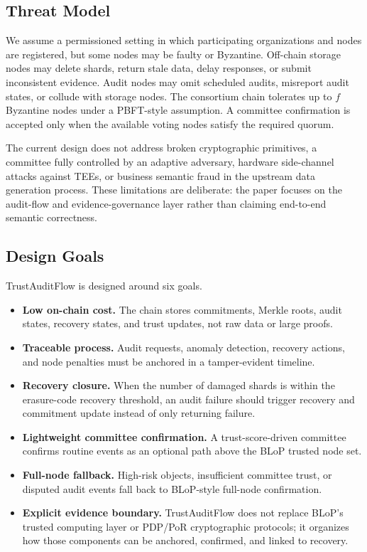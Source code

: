\subsection{Threat Model}

We assume a permissioned setting in which participating organizations and nodes are registered, but some nodes may be faulty or Byzantine. Off-chain storage nodes may delete shards, return stale data, delay responses, or submit inconsistent evidence. Audit nodes may omit scheduled audits, misreport audit states, or collude with storage nodes. The consortium chain tolerates up to $f$ Byzantine nodes under a PBFT-style assumption. A committee confirmation is accepted only when the available voting nodes satisfy the required quorum.

The current design does not address broken cryptographic primitives, a committee fully controlled by an adaptive adversary, hardware side-channel attacks against TEEs, or business semantic fraud in the upstream data generation process. These limitations are deliberate: the paper focuses on the audit-flow and evidence-governance layer rather than claiming end-to-end semantic correctness.

\subsection{Design Goals}

TrustAuditFlow is designed around six goals.

\begin{itemize}
  \item \textbf{Low on-chain cost.} The chain stores commitments, Merkle roots, audit states, recovery states, and trust updates, not raw data or large proofs.
  \item \textbf{Traceable process.} Audit requests, anomaly detection, recovery actions, and node penalties must be anchored in a tamper-evident timeline.
  \item \textbf{Recovery closure.} When the number of damaged shards is within the erasure-code recovery threshold, an audit failure should trigger recovery and commitment update instead of only returning failure.
  \item \textbf{Lightweight committee confirmation.} A trust-score-driven committee confirms routine events as an optional path above the BLoP trusted node set.
  \item \textbf{Full-node fallback.} High-risk objects, insufficient committee trust, or disputed audit events fall back to BLoP-style full-node confirmation.
  \item \textbf{Explicit evidence boundary.} TrustAuditFlow does not replace BLoP's trusted computing layer or PDP/PoR cryptographic protocols; it organizes how those components can be anchored, confirmed, and linked to recovery.
\end{itemize}
